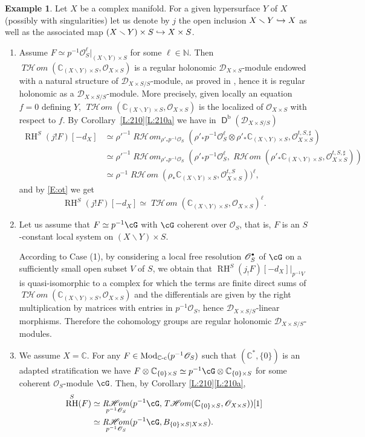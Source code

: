 \documentclass[english]{smfart}
\numberwithin{subsection}{section}
\def\shd{\mathcal{D}}\let\cD\shd
\def\sho{\mathcal{O}}\let\cO\sho
\newcommand{\C}{\mathbb{C}}\let\CC\C
\newcommand{\shhom}{\mathcal{H}\!\mathit{om}}\let\ho\shhom
\DeclareMathOperator{\rh}{\mathit{R}\shhom}
\DeclareMathOperator{\tho}{\mathit{T}\shhom}
\DeclareMathOperator{\RH}{RH}
\newcommand{\rb}{\mathrm{b}}
\newcommand{\Mod}{\mathrm{Mod}}
\newcommand{\cc}{{\C\textup{-c}}}
\newcommand{\XS}{X\times S}
\newcommand{\DXS}{\shd_{\XS/S}}
\DeclareMathOperator{\rD}{\mathsf{D}}
\let\setminus\smallsetminus
\newcommand{\cbbullet}{{\raisebox{1pt}{$\sbullet$}}}
\newcommand{\sbullet}{{\scriptscriptstyle\bullet}}
\newcommand{\pOS}{p^{-1}\sho_S}
\numberwithin{equation}{section}
\theoremstyle{plain}
\theoremstyle{definition}
\newtheorem{example}[equation]{Example}
\def\to{\mathchoice{\longrightarrow}{\rightarrow}{\rightarrow}{\rightarrow}}
\def\hto{\mathrel{\lhook\joinrel\to}}
\begin{document}
\begin{example}\label{Ex:RH}
Let $X$ be a complex manifold. For a given hypersurface $Y$ of $X$ (possibly with singularities) let us denote by $j$ the open inclusion $X\setminus Y\hto X$ as well as the associated map $(X\setminus Y)\times S\hto \XS$.\begin{enumerate}
\item\label{Ex:RH1}
Assume $F\simeq \pOS^\ell|_{(X\setminus Y)\times S}$ for some $\ell \in\mathbb{N}$. Then $\tho(\CC_{(X\setminus Y)\times S}, \sho_{\XS})$ is a regular holonomic $\shd_{\XS}$-module endowed with a natural structure of $\DXS$-module, as proved in \cite{Kashiwara84}, hence it is regular holonomic as a $\DXS$-module. More precisely, given locally an equation $f=0$ defining $Y$, $\tho(\CC_{(X\setminus Y)\times S}, \sho_{\XS})$ is the localized of $\sho_{\XS}$ with respect to $f$. By Corollary~\ref{L:210}\eqref{L:210a} we have in $\rD^\rb(\DXS)$
\begin{align*}
\RH^S(j!F)[-d_X]&\simeq\rho'^{-1}\rh_{\rho'_*\pOS}(\rho'_*\pOS^\ell\otimes \rho'_*\CC_{(X\setminus Y)\times S}, \sho^{t,S,\sharp}_{\XS})\\
&\simeq \rho'^{-1}\rh_{\rho'_*\pOS}(\rho'_*\pOS^\ell,\rh(\rho'_*\CC_{(X\setminus Y)\times S}, \sho^{t,S,\sharp}_{\XS}))\\
&\simeq \rho^{-1}\rh(\rho_*\CC_{(X\setminus Y)\times S}, \sho^{t,S}_{\XS}))^\ell,
\end{align*}
and by \eqref{E:ot} we get $$ \RH^S(j!F)[-d_X] \simeq\tho(\CC_{(X\setminus Y)\times S}, \sho_{\XS})^\ell.$$

\item\label{Ex:RH2}
Let us assume that $F\simeq p^{-1} \cG$ with $\cG$ coherent over $\sho_S$, that is, $F$ is an $S$-constant local system on $(X\setminus Y)\times S$.

According to Case (1), by considering a local free resolution $\sho_S^{\cbbullet}$ of $\cG$ on a sufficiently small open subset $V$ of $S$, we obtain that $\RH^S(j_!F)[-d_X]|_{p^{-1}V}$ is quasi-isomorphic to a complex for which the terms are finite direct sums of $\tho(\CC_{(X\setminus Y)\times S}, \sho_{\XS})$ and the differentials are given by the right multiplication by matrices with entries in $\pOS$, hence $\DXS$-linear morphisms. Therefore the cohomology groups are regular holonomic $\DXS$-modules.

\item\label{Ex:RH3}
We assume $X=\C$.
For any $F\in \Mod_\cc(\pOS)$ such that $(\C^*, \{0\})$ is an adapted stratification we have $F\otimes \CC_{\{0\}\times S}\simeq p^{-1}\cG\otimes \CC_{\{0\}\times S}$ for some coherent $\sho_S$\nobreakdash-module $\cG$. Then, by Corollary \ref{L:210}\eqref{L:210a},
\begin{align*}
\RH^S(F)&\simeq \rh_{\pOS}(p^{-1}\cG, \tho(\CC_{\{0\}\times S}, \sho_{\XS}))[1]\\
&\simeq \rh_{\pOS}(p^{-1}\cG, B_{\{0\}\times S|\XS}).
\end{align*}
\end{enumerate}
\end{example}
\end{document}

